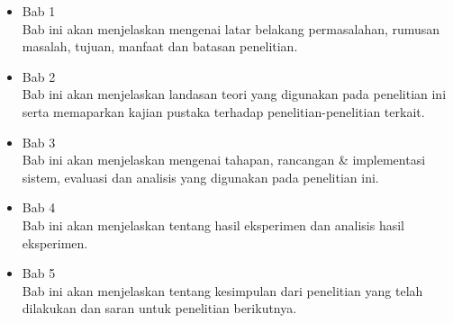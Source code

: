 \begin{itemize}
	\item Bab 1 \babSatu \\
	Bab ini akan menjelaskan mengenai latar belakang permasalahan, rumusan masalah, tujuan, manfaat dan batasan penelitian.
	
	\item Bab 2 \babDua \\
	Bab ini akan menjelaskan landasan teori yang digunakan pada penelitian ini serta memaparkan kajian pustaka terhadap penelitian-penelitian terkait.
	
	\item Bab 3 \babTiga \\
	Bab ini akan menjelaskan mengenai tahapan, rancangan \& implementasi sistem, evaluasi dan analisis yang digunakan pada penelitian ini.
	
	\item Bab 4 \babEmpat \\
	Bab ini akan menjelaskan tentang hasil eksperimen dan analisis hasil eksperimen.
	
	\item Bab 5 \babLima \\
	Bab ini akan menjelaskan tentang kesimpulan dari penelitian yang telah dilakukan dan saran untuk penelitian berikutnya.
\end{itemize}

